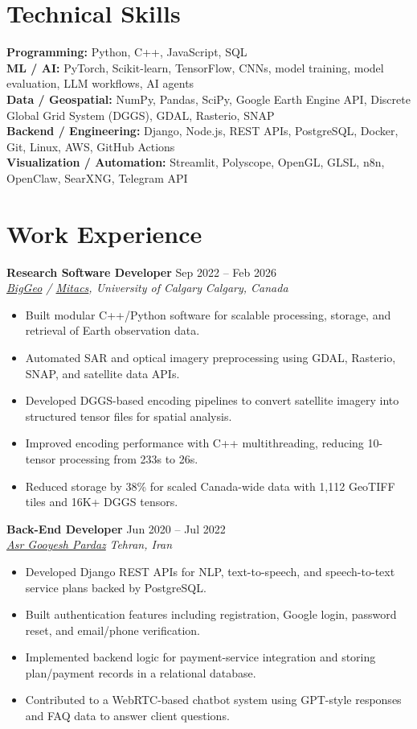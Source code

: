\documentclass[a4paper,10pt]{article}
\newcommand{\resumeSubheading}[4]{
    \textbf{#1} \hfill #2 \\
    \textit{#3} \hfill \textit{#4}
}
\begin{document}
\section*{Technical Skills}

\textbf{Programming:} Python, C++, JavaScript, SQL \\
\textbf{ML / AI:} PyTorch, Scikit-learn, TensorFlow, CNNs, model training, model evaluation, LLM workflows, AI agents \\
\textbf{Data / Geospatial:} NumPy, Pandas, SciPy, Google Earth Engine API, Discrete Global Grid System (DGGS), GDAL, Rasterio, SNAP \\
\textbf{Backend / Engineering:} Django, Node.js, REST APIs, PostgreSQL, Docker, Git, Linux, AWS, GitHub Actions \\
\textbf{Visualization / Automation:} Streamlit, Polyscope, OpenGL, GLSL, n8n, OpenClaw, SearXNG, Telegram API


\section*{Work Experience}

\resumeSubheading
{Research Software Developer}
{Sep 2022 -- Feb 2026}
{\href{https://biggeo.com}{BigGeo} / \href{https://www.mitacs.ca/}{Mitacs}, University of Calgary}
{Calgary, Canada}
\begin{itemize}[leftmargin=0.25in]
    \item Built modular C++/Python software for scalable processing, storage, and retrieval of Earth observation data.
    \item Automated SAR and optical imagery preprocessing using GDAL, Rasterio, SNAP, and satellite data APIs.
    \item Developed DGGS-based encoding pipelines to convert satellite imagery into structured tensor files for spatial analysis.
    \item Improved encoding performance with C++ multithreading, reducing 10-tensor processing from 233s to 26s.
    \item Reduced storage by 38\% for scaled Canada-wide data with 1,112 GeoTIFF tiles and 16K+ DGGS tensors.
\end{itemize}

\resumeSubheading
{Back-End Developer}
{Jun 2020 -- Jul 2022}
{\href{https://asr-gooyesh.com/en/}{Asr Gooyesh Pardaz}}
{Tehran, Iran}
\begin{itemize}[leftmargin=0.25in]
    \item Developed Django REST APIs for NLP, text-to-speech, and speech-to-text service plans backed by PostgreSQL.
    \item Built authentication features including registration, Google login, password reset, and email/phone verification.
    \item Implemented backend logic for payment-service integration and storing plan/payment records in a relational database.
    \item Contributed to a WebRTC-based chatbot system using GPT-style responses and FAQ data to answer client questions.
\end{itemize}
\end{document}
